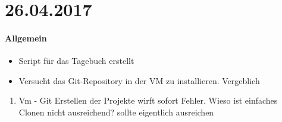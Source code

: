 \section*{26.04.2017}

\paragraph{Allgemein}
\begin{itemize}
	\item Script für das Tagebuch erstellt
	\item Versucht das Git-Repository in der VM zu installieren. Vergeblich
\end{itemize}

\begin{enumerate}
	\item Vm - Git \newline
		Erstellen der Projekte wirft sofort Fehler. Wieso ist einfaches Clonen nicht ausreichend? \answer sollte eigentlich ausreichen
\end{enumerate}